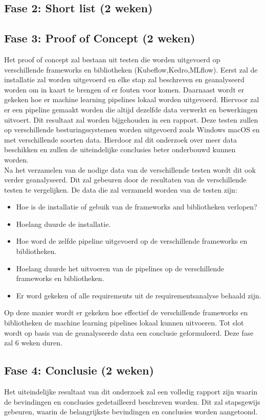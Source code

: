 \subsection{Fase 2: Short list (2 weken)}

\subsection{Fase 3: Proof of Concept (2 weken)}
Het proof of concept zal bestaan uit testen die worden uitgevoerd op verschillende frameworks en bibliotheken (Kubeflow,Kedro,MLflow). Eerst zal de installatie zal worden uitgevoerd en elke stap zal beschreven en geanalyseerd worden om in kaart te brengen of er fouten voor komen. Daarnaast wordt er gekeken hoe er machine learning pipelines lokaal worden uitgevoerd. Hiervoor zal er een pipeline gemaakt worden die altijd dezelfde data verwerkt en bewerkingen uitvoert. Dit resultaat zal worden bijgehouden in een rapport.
Deze testen zullen op verschillende besturingssystemen worden uitgevoerd zoals Windows macOS en met verschillende soorten data. Hierdoor zal dit onderzoek over meer data beschikken en zullen de uiteindelijke conclusies beter onderbouwd kunnen worden.\\

Na het verzamelen van de nodige data van de verschillende testen wordt dit ook verder geanalyseerd. Dit zal gebeuren door de resultaten van de verschillende testen te vergelijken. 
De data die zal verzameld worden van de testen zijn:
\begin{itemize}
  \item Hoe is de installatie of gebuik van de frameworks and bibliotheken verlopen?
  \item Hoelang duurde de installatie.
  \item Hoe word de zelfde pipeline uitgevoerd op de verschillende frameworks en bibliotheken.
  \item Hoelang duurde het uitvoeren van de pipelines op de verschillende frameworks en bibliotheken.
  \item Er word gekeken of alle requirements uit de requirementsanalyse behaald zijn.
\end{itemize}
Op deze manier wordt er gekeken hoe effectief de verschillende frameworks en bibliotheken de machine learning pipelines lokaal kunnen uitvoeren. Tot slot wordt op basis van de geanalyseerde data een conclusie geformuleerd.
Deze fase zal 6 weken duren.\\
\subsection{Fase 4: Conclusie (2 weken)}
Het uiteindelijke resultaat van dit onderzoek zal een volledig rapport zijn waarin de bevindingen en conclusies gedetailleerd beschreven worden. Dit zal stapsgewijs gebeuren, waarin de belangrijkste bevindingen en conclusies worden aangetoond.\\

